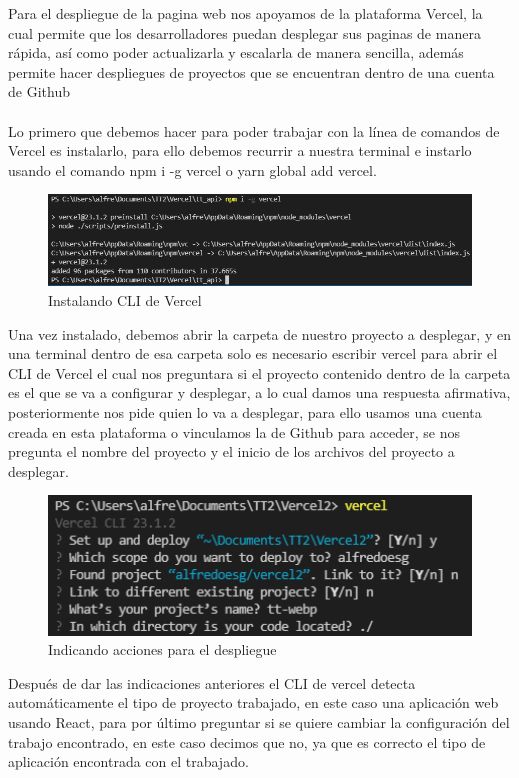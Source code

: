 \documentclass[12pt, a4paper, titlepage]{report}
\begin{document}
Para el despliegue de la pagina web nos apoyamos de la plataforma Vercel, la cual permite que los desarrolladores puedan desplegar sus paginas de manera rápida, así como poder actualizarla y escalarla de manera sencilla, además permite hacer despliegues de proyectos que se encuentran dentro de una cuenta de Github\\\\
Lo primero que debemos hacer para poder trabajar con la línea de comandos de Vercel es instalarlo, para ello debemos recurrir a nuestra terminal e instarlo usando el comando npm i -g vercel o yarn global add vercel.
\begin{figure}[H]
	\includegraphics[width=12cm]{./imagenes/Desarrollo/Despliegue/Instalacion.png}
	\centering 
	\caption{Instalando CLI de Vercel}
\end{figure}
Una vez instalado, debemos abrir la carpeta de nuestro proyecto a desplegar, y en una terminal dentro de esa carpeta solo es necesario escribir vercel para abrir el CLI de Vercel el cual nos preguntara si el proyecto contenido dentro de la carpeta es el que se va a configurar y desplegar, a lo cual damos una respuesta afirmativa, posteriormente nos pide quien lo va a desplegar, para ello usamos una cuenta creada en esta plataforma o vinculamos la de Github para acceder, se nos pregunta el nombre del proyecto y el inicio de los archivos del proyecto a desplegar.
\begin{figure}[H]
	\includegraphics[width=12cm]{./imagenes/Desarrollo/Despliegue/Acciones.png}
	\centering 
	\caption{Indicando acciones para el despliegue}
\end{figure}
Después de dar las indicaciones anteriores el CLI de vercel detecta automáticamente el tipo de proyecto trabajado, en este caso una aplicación web usando React, para por último preguntar si se quiere cambiar la configuración del trabajo encontrado, en este caso decimos que no, ya que es correcto el tipo de aplicación encontrada con el trabajado.
\end{document}
